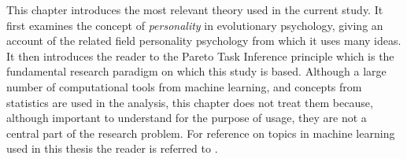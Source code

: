 This chapter introduces the most relevant theory used in the current study. It first examines the concept of \textit{personality} in evolutionary psychology, giving an account of the related field personality psychology from which it uses many ideas. It then introduces the reader to the Pareto Task Inference principle which is the fundamental research paradigm on which this study is based. Although a large number of computational tools from machine learning, and concepts from statistics are used in the analysis, this chapter does not treat them because, although important to understand for the purpose of usage, they are not a central part of the research problem. For reference on topics in machine learning used in this thesis the reader is referred to \cite{bishop2006pattern}.
